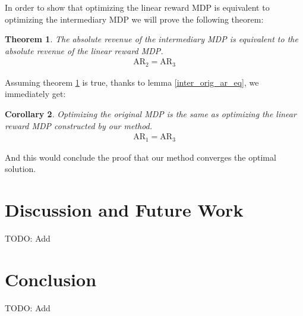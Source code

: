 \documentclass{article}
\newtheorem{theorem}{Theorem}
\newtheorem{corollary}[theorem]{Corollary}
\begin{document}
In order to show that optimizing the linear reward MDP is equivalent to optimizing the intermediary MDP we will prove the following theorem:
\begin{theorem}\label{lin_inter_ar_eq}
    The absolute revenue of the intermediary MDP is equivalent to the absolute revenue of the linear reward MDP.
    \begin{gather*}
        \text{AR}_2 = \text{AR}_3
    \end{gather*}
\end{theorem}
Assuming theorem \ref{lin_inter_ar_eq} is true, thanks to lemma \ref{inter_orig_ar_eq}, we immediately get:
\begin{corollary}
    Optimizing the original MDP is the same as optimizing the linear reward MDP constructed by our method.
    \begin{gather*}
        \text{AR}_1 = \text{AR}_3
    \end{gather*}
\end{corollary}
And this would conclude the proof that our method converges the optimal solution.

\section{Discussion and Future Work}
TODO: Add

\section{Conclusion}
TODO: Add



\end{document}
